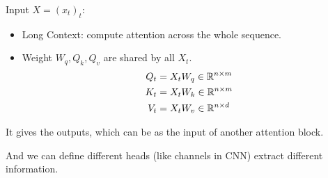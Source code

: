 Input  $ X=(x_t)_t $:
\begin{itemize}
    \item Long Context: compute attention across the whole sequence.
    \item Weight  $ W_q,Q_k,Q_v $  are shared by all  $ X_t $.
    \[\begin{aligned}
        Q_t&=X_tW_q\in \mathbb R^{n\times m}\\
        K_t&=X_tW_k\in \mathbb R^{n\times m}\\
        V_t&=X_tW_v\in \mathbb R^{n\times d}
    \end{aligned}\]
\end{itemize}
It gives the outputs, which can be as the input of another attention block.

And we can define different heads (like channels in CNN) extract different information.